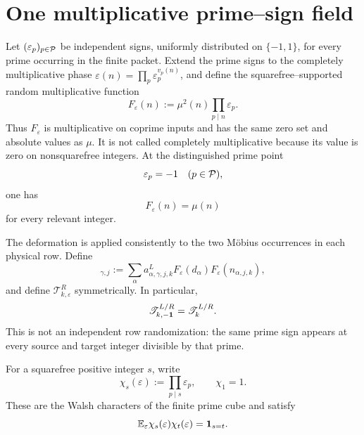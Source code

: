 \section{One multiplicative prime--sign field}
\label{sec:tpc43-prime-sign}

Let \((\varepsilon_p)_{p\in\mathcal P}\) be independent signs, uniformly
distributed on \(\{-1,1\}\), for every prime occurring in the finite
packet.  Extend the prime signs to the completely multiplicative phase
\(\varepsilon(n)=\prod_p\varepsilon_p^{v_p(n)}\), and define the
squarefree--supported random multiplicative function
\begin{equation}
 F_\varepsilon(n)
 :=\mu^2(n)\prod_{p\mid n}\varepsilon_p.
 \label{eq:tpc43-rademacher-multiplicative}
\end{equation}
Thus \(F_\varepsilon\) is multiplicative on coprime inputs and has the
same zero set and absolute values as \(\mu\).  It is not called
completely multiplicative because its value is zero on nonsquarefree
integers.  At the distinguished prime point
\begin{equation}
 \varepsilon_p=-1\quad(p\in\mathcal P),
 \label{eq:tpc43-all-minus-point}
\end{equation}
one has
\begin{equation}
 F_\varepsilon(n)=\mu(n)
 \label{eq:tpc43-all-minus-is-mobius}
\end{equation}
for every relevant integer.

The deformation is applied consistently to the two M\"obius occurrences
in each physical row.  Define
\begin{equation}
 [\mathscr T_{k,\varepsilon}^L]_{\gamma,j}
 :=\sum_\alpha
 a^L_{\alpha,\gamma,j,k}
 F_\varepsilon(d_\alpha)
 F_\varepsilon(n_{\alpha,j,k}),
 \label{eq:tpc43-random-left-column}
\end{equation}
and define \(\mathscr T_{k,\varepsilon}^R\) symmetrically.  In
particular,
\begin{equation}
 \mathscr T_{k,-\mathbf 1}^{L/R}=\mathscr T_k^{L/R}.
 \label{eq:tpc43-physical-corner}
\end{equation}
This is not an independent row randomization: the same prime sign appears
at every source and target integer divisible by that prime.

For a squarefree positive integer \(s\), write
\begin{equation}
 \chi_s(\varepsilon):=\prod_{p\mid s}\varepsilon_p,
 \qquad \chi_1=1.
 \label{eq:tpc43-Walsh-character}
\end{equation}
These are the Walsh characters of the finite prime cube and satisfy
\begin{equation}
 \mathbb E_\varepsilon
 \chi_s(\varepsilon)\chi_t(\varepsilon)
 =\mathbf 1_{s=t}.
 \label{eq:tpc43-Walsh-orthogonality}
\end{equation}

